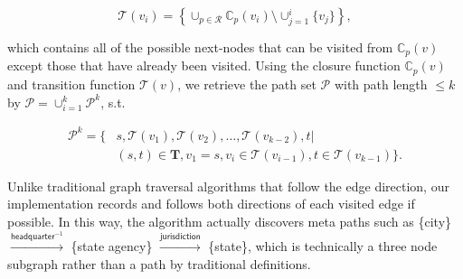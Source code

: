 \documentclass[reprint,twocolumn,showpacs,preprintnumbers,amsmath, aps,pre,amssymb]{revtex4-1}
\begin{document}
\begin{equation}
\mathcal{T}(v_i) = \left\{\cup_{p \in \mathcal{R}}\mathbb{C}_{p}(v_{i}) \setminus \cup_{j=1}^{i}\{v_j\}\right\},
\end{equation}

\noindent{}which contains all of the possible next-nodes that can be visited from $\mathbb{C}_p(v)$ except those that have already been visited. Using the closure function $\mathbb{C}_p(v)$ and transition function $\mathcal{T}(v)$, we retrieve the path set $\mathcal{P}$ with path length $\leq k$ by $\mathcal{P} = \cup_{i=1}^k \mathcal{P}^k$, s.t.

\begin{equation}
\begin{split}
\mathcal{P}^k = \{&s, \mathcal{T}(v_1), \mathcal{T}(v_2), \ldots, \mathcal{T}(v_{k-2}), t | \\ & (s,t)\in\mathbf{T}, v_1 = s, v_i \in \mathcal{T}(v_{i-1}), t \in \mathcal{T}(v_{k-1}) \}.
\end{split}
\end{equation}


Unlike traditional graph traversal algorithms that follow the edge direction, our implementation records and follows both directions of each visited edge if possible. In this way, the algorithm actually discovers meta paths such as \{\textsf{city}\} $\xrightarrow{\textsf{headquarter}^{-1}}$ \{\textsf{state agency}\} $\xrightarrow {\textsf{jurisdiction}}$ \{\textsf{state}\}, which is technically a three node subgraph rather than a path by traditional definitions.




\end{document}

